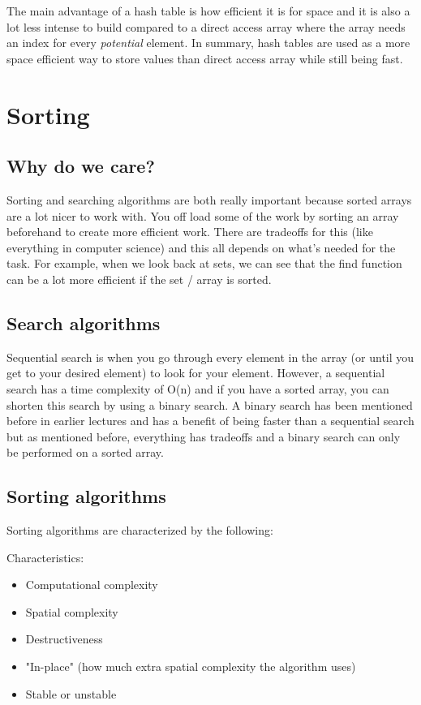 \documentclass[11pt,a4paper,english]{report}
\begin{document}
\bigskip
\noindent
The main advantage of a hash table is how efficient it is for space and it is also a lot less intense to build compared to a direct access array where the array needs an index for every \textit{potential} element. In summary, hash tables are used as a more space efficient way to store values than direct access array while still being fast.


\chapter{Sorting}

\section{Why do we care?}

Sorting and searching algorithms are both really important because sorted arrays are a lot nicer to work with. You off load some of the work by sorting an array beforehand to create more efficient work. There are tradeoffs for this (like everything in computer science) and this all depends on what's needed for the task. For example, when we look back at sets, we can see that the find function can be a lot more efficient if the set / array is sorted. 

\section{Search algorithms}

Sequential search is when you go through every element in the array (or until you get to your desired element) to look for your element. However, a sequential search has a time complexity of O(n) and if you have a sorted array, you can shorten this search by using a binary search. A binary search has been mentioned before in earlier lectures and has a benefit of being faster than a sequential search but as mentioned before, everything has tradeoffs and a binary search can only be performed on a sorted array.

\section{Sorting algorithms}

Sorting algorithms are characterized by the following:

\bigskip
\begin{bluebox}{Characteristics:}{
\begin{itemize}

  \item Computational complexity
  \item Spatial complexity
  \item Destructiveness
  \item "In-place" (how much extra spatial complexity the algorithm uses)
  \item Stable or unstable

\end{itemize}
}\end{bluebox}
\end{document}
